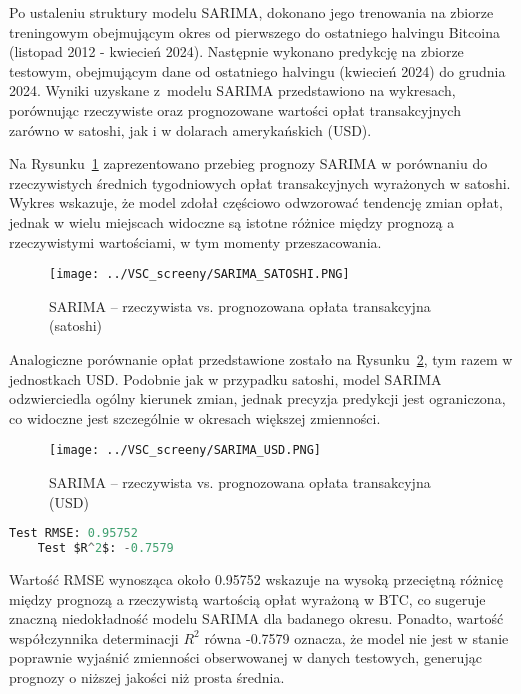 \documentclass[12pt,a4paper]{report}
\theoremstyle{definition} %
\begin{document}
	Po ustaleniu struktury modelu SARIMA, dokonano jego trenowania na zbiorze treningowym obejmującym okres od pierwszego do ostatniego halvingu Bitcoina (listopad 2012 - kwiecień 2024). Następnie wykonano predykcję na zbiorze testowym, obejmującym dane od ostatniego halvingu (kwiecień 2024) do grudnia 2024. Wyniki uzyskane z~modelu SARIMA przedstawiono na wykresach, porównując rzeczywiste oraz prognozowane wartości opłat transakcyjnych zarówno w satoshi, jak i w dolarach amerykańskich (USD).
	
	Na Rysunku~\ref{fig:SARIMASatoshi} zaprezentowano przebieg prognozy SARIMA w porównaniu do rzeczywistych średnich tygodniowych opłat transakcyjnych wyrażonych w satoshi. Wykres wskazuje, że model zdołał częściowo odwzorować tendencję zmian opłat, jednak w wielu miejscach widoczne są istotne różnice między prognozą a rzeczywistymi wartościami, w tym momenty przeszacowania.
	
	\begin{figure}[H]
	\centering
	\texttt{[image: ../VSC\_screeny/SARIMA\_SATOSHI.PNG]}
	\caption{SARIMA – rzeczywista vs. prognozowana opłata transakcyjna (satoshi)}
	\label{fig:SARIMASatoshi}
	\end{figure}
	
	Analogiczne porównanie opłat przedstawione zostało na Rysunku~\ref{fig:SARIMAUSD}, tym razem w jednostkach USD. Podobnie jak w przypadku satoshi, model SARIMA odzwierciedla ogólny kierunek zmian, jednak precyzja predykcji jest ograniczona, co widoczne jest szczególnie w okresach większej zmienności.
	
	\begin{figure}[H]
	\centering
	\texttt{[image: ../VSC\_screeny/SARIMA\_USD.PNG]}
	\caption{SARIMA – rzeczywista vs. prognozowana opłata transakcyjna (USD)}
	\label{fig:SARIMAUSD}
	\end{figure}
	
	\begin{lstlisting}[language=Python,mathescape=true,caption=Wyniki predykcji SARIMA na zbiorze testowym,label=wynikiSARIMA]
	Test RMSE: 0.95752
	Test $R^2$: -0.7579
	\end{lstlisting}

Wartość RMSE wynosząca około 0.95752 wskazuje na wysoką przeciętną różnicę między prognozą a rzeczywistą wartością opłat wyrażoną w BTC, co sugeruje znaczną niedokładność modelu SARIMA dla badanego okresu. Ponadto, wartość współczynnika determinacji $R^2$ równa -0.7579 oznacza, że model nie jest w stanie poprawnie wyjaśnić zmienności obserwowanej w danych testowych, generując prognozy o niższej jakości niż prosta średnia.
\end{document}
